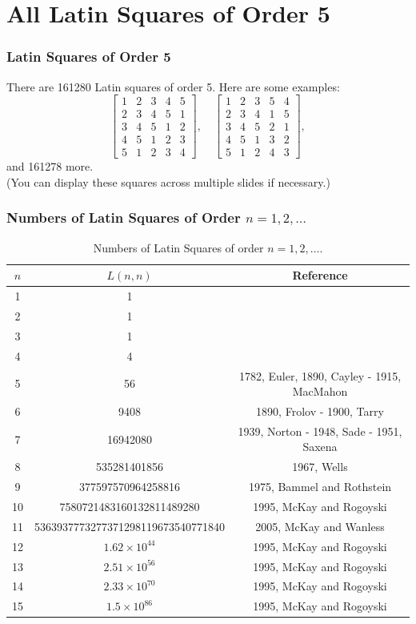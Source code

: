 \documentclass{beamer}
\begin{document}
\section{All Latin Squares of Order 5}
\begin{frame}
\frametitle{Latin Squares of Order 5}
There are 161280 Latin squares of order 5. Here are some examples:
\[
\begin{bmatrix}
1 & 2 & 3 & 4 & 5 \\
2 & 3 & 4 & 5 & 1 \\
3 & 4 & 5 & 1 & 2 \\
4 & 5 & 1 & 2 & 3 \\
5 & 1 & 2 & 3 & 4
\end{bmatrix},
\quad
\begin{bmatrix}
1 & 2 & 3 & 5 & 4 \\
2 & 3 & 4 & 1 & 5 \\
3 & 4 & 5 & 2 & 1 \\
4 & 5 & 1 & 3 & 2 \\
5 & 1 & 2 & 4 & 3
\end{bmatrix},
\]
and 161278 more.\\
(You can display these squares across multiple slides if necessary.)
\end{frame}

\begin{frame}
\frametitle{Numbers of Latin Squares of Order $n=1, 2, \dots$}
\begin{table}[ht]
\centering
\begin{tabular}{|c|c|c|}
\hline
$n$ & $L(n,n)$ & Reference \\
\hline
1 & 1 & \\
2 & 1 & \\
3 & 1 & \\
4 & 4 & \\
5 & 56 & 1782, Euler, 1890, Cayley - 1915, MacMahon \\
6 & 9408 & 1890, Frolov - 1900, Tarry \\
7 & 16942080 & 1939, Norton - 1948, Sade - 1951, Saxena \\
8 & 535281401856 & 1967, Wells \\
9 & 377597570964258816 & 1975, Bammel and Rothstein \\
10 & 7580721483160132811489280 & 1995, McKay and Rogoyski \\
11 & 5363937773277371298119673540771840 & 2005, McKay and Wanless \\
12 & $1.62 \times 10^{44}$ & 1995, McKay and Rogoyski \\
13 & $2.51 \times 10^{56}$ & 1995, McKay and Rogoyski \\
14 & $2.33 \times 10^{70}$ & 1995, McKay and Rogoyski \\
15 & $1.5 \times 10^{86}$ & 1995, McKay and Rogoyski \\
\hline
\end{tabular}
\caption{Numbers of Latin Squares of order $n=1, 2, \dots$.}
\end{table}
\end{frame}
\end{document}
